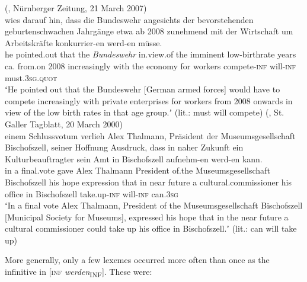 \documentclass[output=paper,hidelinks]{langscibook}
\begin{document}
\begin{enumerate}[label=(\roman*)]
\ea\label{ex:reiner:23} 	 (, Nürnberger Zeitung, 21 March 2007) \\
 {wies} {darauf} {hin,}	{dass}	{die}	{Bundeswehr}  {angesichts}	{der}	{bevorstehenden}  {geburtenschwachen}	{Jahrgänge}	{etwa}    {ab}		{2008}		{zunehmend}   {mit}	{der}	{Wirtschaft}	{um}	{Arbeitskräfte}   {konkurrier-en}		{werd-en}	{müsse.}\\
he	pointed.out    {} {}	that	the	\emph{Bundeswehr}  in.view.of	the	imminent    low-birthrate		years		ca. from.on		2008		increasingly    with	the	economy	for	workers compete-\textsc{inf}		will-\textsc{inf}	must.\textsc{3sg}.\textsc{quot}\\
\glt ʻHe pointed out that the Bundeswehr [German armed forces] would have to compete increasingly with private enterprises for workers from 2008 onwards in view of the low birth rates in that age group.ʼ (lit.: must will compete)
\ex\label{ex:reiner:24} 	 (, St. Galler Tagblatt, 20 March 2000) \\
		{einem}		{Schlussvotum}	{verlieh} {Alex}	{Thalmann,}	{Präsident}	{der} {Museumsgesellschaft}		{Bischofszell,}		{seiner}  {Hoffnung}	{Ausdruck,}	{dass}	{in}	{naher}	{Zukunft} {ein}	{Kulturbeauftragter}		{sein}	{Amt}	{in}  {Bischofszell}	{aufnehm-en}	{werd-en}	{kann.}\\
in		a		final.vote		gave    Alex	Thalmann	President	of.the  Museumsgesellschaft		Bischofszell		his hope		expression	that	in	near	future  a		cultural.commissioner	his	office	in  Bischofszell	take.up-\textsc{inf}	will-\textsc{inf}	can.\textsc{3sg}\\
\glt  ʻIn a final vote Alex Thalmann, President of the Museumsgesellschaft Bischofszell [Municipal Society for Museums], expressed his hope that in the near future a cultural commissioner could take up his office in Bischofszell.ʼ (lit.: can will take up) 
\z 

More generally, only a few lexemes occurred more often than once as the infinitive in [\textsc{inf} \textit{werden}\textsubscript{INF}]. These were:


\end{enumerate}
\end{document}
